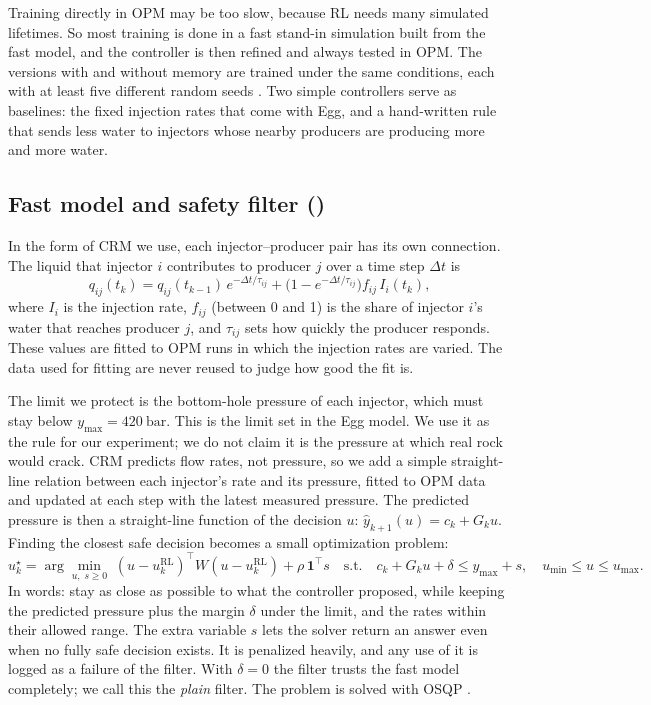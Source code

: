 \documentclass[11pt,letterpaper]{article}
\begin{document}
Training directly in OPM may be too slow, because RL needs many simulated lifetimes. So
most training is done in a fast stand-in simulation built from the fast model, and the
controller is then refined and always tested in OPM. The versions with and without memory
are trained under the same conditions, each with at least five different random seeds
\cite{henderson2018matters}. Two simple controllers serve as baselines: the fixed injection
rates that come with Egg, and a hand-written rule that sends less water to injectors whose
nearby producers are producing more and more water.

\subsection{Fast model and safety filter (\IsmaelS)}

In the form of CRM we use, each injector--producer pair has its own connection. The liquid
that injector $i$ contributes to producer $j$ over a time step $\Delta t$ is
\begin{equation}\label{eq:crm}
q_{ij}(t_k) = q_{ij}(t_{k-1})\,e^{-\Delta t/\tau_{ij}}
  + \bigl(1-e^{-\Delta t/\tau_{ij}}\bigr) f_{ij}\, I_i(t_k),
\end{equation}
where $I_i$ is the injection rate, $f_{ij}$ (between 0 and 1) is the share of injector
$i$'s water that reaches producer $j$, and $\tau_{ij}$ sets how quickly the producer
responds. These values are fitted to OPM runs in which the injection rates are varied. The
data used for fitting are never reused to judge how good the fit is.

The limit we protect is the bottom-hole pressure of each injector, which must stay below
$y_{\max}=\SI{420}{\bar}$. This is the limit set in the Egg model. We use it as the rule
for our experiment; we do not claim it is the pressure at which real rock would crack. CRM
predicts flow rates, not pressure, so we add a simple straight-line relation between each
injector's rate and its pressure, fitted to OPM data and updated at each step with the
latest measured pressure. The predicted pressure is then a straight-line function of the
decision $u$: $\hat y_{k+1}(u)=c_k+G_k u$. Finding the closest safe decision becomes a
small optimization problem:
\begin{equation}\label{eq:qp}
u^\star_k = \arg\min_{u,\;s\ge 0}\;
 (u-u^{\mathrm{RL}}_k)^{\!\top} W (u-u^{\mathrm{RL}}_k) + \rho\,\mathbf{1}^{\!\top}s
\quad\text{s.t.}\quad
 c_k + G_k u + \delta \le y_{\max} + s,\quad u_{\min}\le u\le u_{\max}.
\end{equation}
In words: stay as close as possible to what the controller proposed, while keeping the
predicted pressure plus the margin $\delta$ under the limit, and the rates within their
allowed range. The extra variable $s$ lets the solver return an answer even when no fully
safe decision exists. It is penalized heavily, and any use of it is logged as a failure of
the filter. With $\delta=0$ the filter trusts the fast model completely; we call this the
\emph{plain} filter. The problem is solved with OSQP \cite{stellato2020osqp}.
\end{document}
